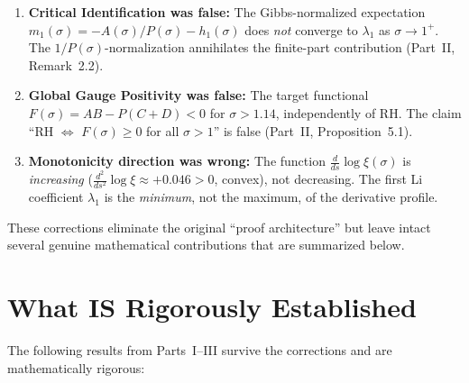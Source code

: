 \documentclass[12pt,a4paper]{article}
\theoremstyle{definition}
\theoremstyle{remark}
\begin{document}
\begin{enumerate}[label=(K\arabic*)]
  \item \textbf{Critical Identification was false:} The Gibbs-normalized expectation $m_1(\sigma) = -A(\sigma)/P(\sigma) - h_1(\sigma)$ does \emph{not} converge to $\lambda_1$ as $\sigma \to 1^+$. The $1/P(\sigma)$-normalization annihilates the finite-part contribution (Part~II, Remark~2.2).

  \item \textbf{Global Gauge Positivity was false:} The target functional $F(\sigma) = AB - P(C+D) < 0$ for $\sigma > 1.14$, independently of RH. The claim ``RH $\Leftrightarrow$ $F(\sigma) \ge 0$ for all $\sigma > 1$'' is false (Part~II, Proposition~5.1).

  \item \textbf{Monotonicity direction was wrong:} The function $\frac{d}{ds}\log\xi(\sigma)$ is \emph{increasing} ($\frac{d^2}{ds^2}\log\xi \approx +0.046 > 0$, convex), not decreasing. The first Li coefficient $\lambda_1$ is the \emph{minimum}, not the maximum, of the derivative profile.
\end{enumerate}

These corrections eliminate the original ``proof architecture'' but leave intact several genuine mathematical contributions that are summarized below.


\section{What IS Rigorously Established}

The following results from Parts~I--III survive the corrections and are mathematically rigorous:
\end{document}
